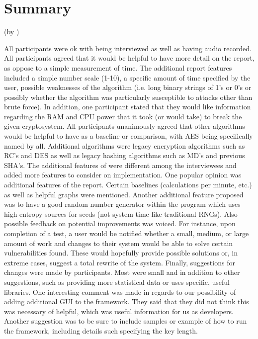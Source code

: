 \section{Summary}
(by \dd) \bigskip

All participants were ok with being interviewed as well as
having audio recorded. All participants
agreed that it would be helpful to have more detail on the
report, as oppose to a simple measurement of time. The
additional report features included a simple number scale
(1-10), a specific amount of time specified by the user,
possible weaknesses of the algorithm (i.e. long binary
strings of 1's or 0's or possibly whether the algorithm was
particularly susceptible to attacks other than brute force).
In addition, one participant stated that they would like
information regarding the RAM and CPU power that it took (or
would take) to break the given cryptosystem. All
participants unanimously agreed that other algorithms would
be helpful to have as a baseline or comparison, with AES
being specifically named by all. Additional algorithms were
legacy encryption algorithms such as RC's and DES as well as
legacy hashing algorithms such as MD's and previous SHA's.
The additional features of \cry{} were different among the
interviewees and added more features to consider on
implementation. One popular opinion was additional features
of the report. Certain baselines (calculations per minute,
etc.) as well as helpful graphs were mentioned. Another
additional feature proposed was to have a good random number
generator within the program which uses high entropy sources
for seeds (not system time like traditional RNGs). Also
possible feedback on potential improvements was voiced. For
instance, upon completion of a test, a user would be
notified whether a small, medium, or large amount of work
and changes to their system would be able to solve certain
vulnerabilities found. These would hopefully provide possible
solutions or, in extreme cases, suggest a total rewrite of
the system. Finally, suggestions for changes were made by
participants. Most were small and in addition to other
suggestions, such as providing more statistical data or uses
specific, useful libraries. One interesting comment was made
in regards to our possibility of adding additional GUI to the
framework. They said that they did not think this was
necessary of helpful, which was useful information for us as
developers. Another suggestion was to be sure to include
samples or example of how to run the framework, including
details such specifying the key length.


